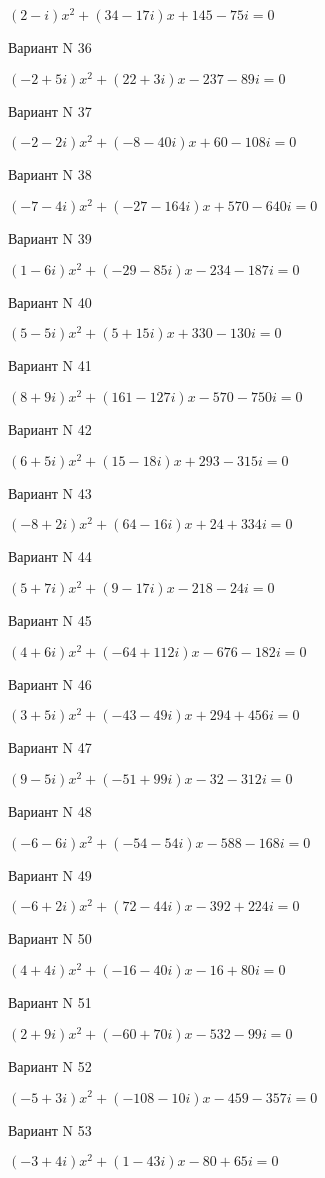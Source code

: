 \documentclass[11pt]{report}
\begin{document}
$(2 - i)x^2 + (34 - 17 i)x + 145 - 75 i = 0$

Вариант N 36

$(-2 + 5 i)x^2 + (22 + 3 i)x  -237 - 89 i = 0$

Вариант N 37

$(-2 - 2 i)x^2 + (-8 - 40 i)x + 60 - 108 i = 0$

Вариант N 38

$(-7 - 4 i)x^2 + (-27 - 164 i)x + 570 - 640 i = 0$

Вариант N 39

$(1 - 6 i)x^2 + (-29 - 85 i)x  -234 - 187 i = 0$

Вариант N 40

$(5 - 5 i)x^2 + (5 + 15 i)x + 330 - 130 i = 0$

Вариант N 41

$(8 + 9 i)x^2 + (161 - 127 i)x  -570 - 750 i = 0$

Вариант N 42

$(6 + 5 i)x^2 + (15 - 18 i)x + 293 - 315 i = 0$

Вариант N 43

$(-8 + 2 i)x^2 + (64 - 16 i)x + 24 + 334 i = 0$

Вариант N 44

$(5 + 7 i)x^2 + (9 - 17 i)x  -218 - 24 i = 0$

Вариант N 45

$(4 + 6 i)x^2 + (-64 + 112 i)x  -676 - 182 i = 0$

Вариант N 46

$(3 + 5 i)x^2 + (-43 - 49 i)x + 294 + 456 i = 0$

Вариант N 47

$(9 - 5 i)x^2 + (-51 + 99 i)x  -32 - 312 i = 0$

Вариант N 48

$(-6 - 6 i)x^2 + (-54 - 54 i)x  -588 - 168 i = 0$

Вариант N 49

$(-6 + 2 i)x^2 + (72 - 44 i)x  -392 + 224 i = 0$

Вариант N 50

$(4 + 4 i)x^2 + (-16 - 40 i)x  -16 + 80 i = 0$

Вариант N 51

$(2 + 9 i)x^2 + (-60 + 70 i)x  -532 - 99 i = 0$

Вариант N 52

$(-5 + 3 i)x^2 + (-108 - 10 i)x  -459 - 357 i = 0$

Вариант N 53

$(-3 + 4 i)x^2 + (1 - 43 i)x  -80 + 65 i = 0$
\end{document}
